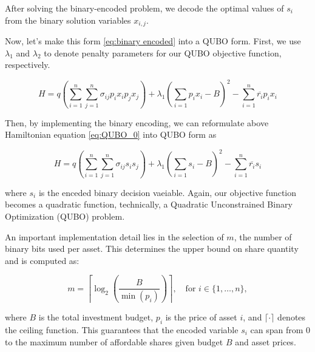 \documentclass[12pt]{article}
\begin{document}
After solving the binary-encoded problem, we decode the optimal values of $s_i$ from the binary solution variables $x_{i,j}$.

Now, let's make this form \ref{eq:binary encoded} into a QUBO form. First, we use $\lambda_{1}$ and $\lambda_{2}$ to denote penalty parameters for our QUBO objective function, respectively.

\begin{equation}
H = q(\sum_{i=1}^{n}\sum_{j=1}^{n} \sigma_{ij}p_{i}x_{i}p_{j}x_{j}) + \lambda_{1}(\sum_{i=1}p_{i}x_{i} - B)^{2} - \sum_{i=1}^{n}\overline{r_{i}} p_{i}x_{i}
\label{eq:QUBO_0}
\end{equation}

Then, by implementing the binary encoding, we can reformulate above Hamiltonian equation \ref{eq:QUBO_0} into QUBO form as 

\begin{equation}
H = q(\sum_{i=1}^{n}\sum_{j=1}^{n} \sigma_{ij}s_{i}s_{j}) + \lambda_{1}(\sum_{i=1}s_{i} - B)^{2} - \sum_{i=1}^{n}\overline{r_{i}} s_{i}
\label{eq:QUBO_binary_encoded}
\end{equation}

where $s_i$ is the enceded binary decision vaeiable. Again, our objective function becomes a quadratic function, technically, a Quadratic Unconstrained Binary Optimization (QUBO) problem.

An important implementation detail lies in the selection of $m$, the number of binary bits used per asset. This determines the upper bound on share quantity and is computed as:

\begin{equation}
m = \left\lceil \log_2\left( \frac{B}{\min(p_i)} \right) \right\rceil, \quad \text{for } i \in \{1, \dots, n\},
\label{eq:num_bits}
\end{equation}

where $B$ is the total investment budget, $p_i$ is the price of asset $i$, and $\lceil \cdot \rceil$ denotes the ceiling function. This guarantees that the encoded variable $s_i$ can span from 0 to the maximum number of affordable shares given budget $B$ and asset prices.
\end{document}
